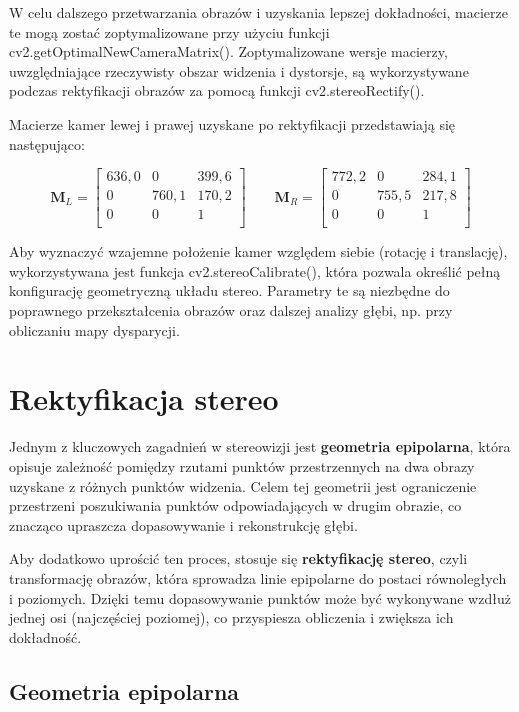 \documentclass[magisterska]{pracadypl}
\begin{document}
W celu dalszego przetwarzania obrazów i uzyskania lepszej dokładności, macierze te mogą zostać zoptymalizowane przy użyciu funkcji cv2.getOptimalNewCameraMatrix(). Zoptymalizowane wersje macierzy, uwzględniające rzeczywisty obszar widzenia i dystorsje, są wykorzystywane podczas rektyfikacji obrazów za pomocą funkcji cv2.stereoRectify().

Macierze kamer lewej i prawej uzyskane po rektyfikacji przedstawiają się następująco:

\[
\mathbf{M}_L =
\begin{bmatrix}
636,0 & 0 & 399,6 \\
0 & 760,1 & 170,2 \\
0 & 0 & 1 \\
\end{bmatrix}
\qquad
\mathbf{M}_R =
\begin{bmatrix}
772,2 & 0 & 284,1 \\
0 & 755,5 & 217,8 \\
0 & 0 & 1 \\
\end{bmatrix}
\]

Aby wyznaczyć wzajemne położenie kamer względem siebie (rotację i translację), wykorzystywana jest funkcja cv2.stereoCalibrate(), która pozwala określić pełną konfigurację geometryczną układu stereo. Parametry te są niezbędne do poprawnego przekształcenia obrazów oraz dalszej analizy głębi, np. przy obliczaniu mapy dysparycji.

\section{Rektyfikacja stereo}

Jednym z kluczowych zagadnień w stereowizji jest \textbf{geometria epipolarna}, która opisuje zależność pomiędzy rzutami punktów przestrzennych na dwa obrazy uzyskane z różnych punktów widzenia. Celem tej geometrii jest ograniczenie przestrzeni poszukiwania punktów odpowiadających w drugim obrazie, co znacząco upraszcza dopasowywanie i rekonstrukcję głębi.

Aby dodatkowo uprościć ten proces, stosuje się \textbf{rektyfikację stereo}, czyli transformację obrazów, która sprowadza linie epipolarne do postaci równoległych i poziomych. Dzięki temu dopasowywanie punktów może być wykonywane wzdłuż jednej osi (najczęściej poziomej), co przyspiesza obliczenia i zwiększa ich dokładność.

\subsection{Geometria epipolarna}
\end{document}
